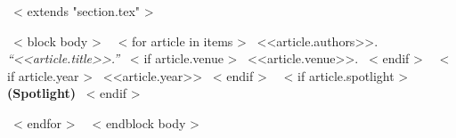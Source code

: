 ~< extends "section.tex" >~

~< block body >~
  ~< for article in items >~
    <<article.authors>>. {\it``<<article.title>>.''}
    ~< if article.venue >~
      <<article.venue>>.
    ~< endif >~
    ~< if article.year >~
      <<article.year>>
    ~< endif >~
    ~< if article.spotlight >~
      {\bf {\color{red}(Spotlight)}}
    ~< endif >~

  ~< endfor >~
~< endblock body >~